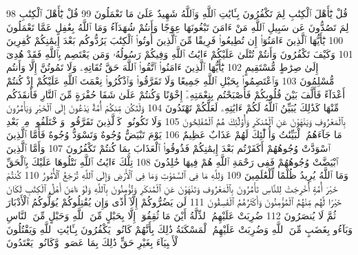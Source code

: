 {\tiny\colorbox{cl_aya}{98}} قُلْ يَٰٓأَهْلَ ٱلْكِتَٰبِ لِمَ تَكْفُرُونَ بِـَٔايَٰتِ ٱللَّهِ وَٱللَّهُ شَهِيدٌ عَلَىٰ مَا تَعْمَلُونَ
{\tiny\colorbox{cl_aya}{99}} قُلْ يَٰٓأَهْلَ ٱلْكِتَٰبِ لِمَ تَصُدُّونَ عَن سَبِيلِ ٱللَّهِ مَنْ ءَامَنَ تَبْغُونَهَا عِوَجًا وَأَنتُمْ شُهَدَآءُ وَمَا ٱللَّهُ بِغَٰفِلٍ عَمَّا تَعْمَلُونَ
{\tiny\colorbox{cl_aya}{100}} يَٰٓأَيُّهَا ٱلَّذِينَ ءَامَنُوٓا۟ إِن تُطِيعُوا۟ فَرِيقًا مِّنَ ٱلَّذِينَ أُوتُوا۟ ٱلْكِتَٰبَ يَرُدُّوكُم بَعْدَ إِيمَٰنِكُمْ كَٰفِرِينَ
{\tiny\colorbox{cl_aya}{101}} وَكَيْفَ تَكْفُرُونَ وَأَنتُمْ تُتْلَىٰ عَلَيْكُمْ ءَايَٰتُ ٱللَّهِ وَفِيكُمْ رَسُولُهُۥ وَمَن يَعْتَصِم بِٱللَّهِ فَقَدْ هُدِىَ إِلَىٰ صِرَٰطٍ مُّسْتَقِيمٍ
{\tiny\colorbox{cl_aya}{102}} يَٰٓأَيُّهَا ٱلَّذِينَ ءَامَنُوا۟ ٱتَّقُوا۟ ٱللَّهَ حَقَّ تُقَاتِهِۦ وَلَا تَمُوتُنَّ إِلَّا وَأَنتُم مُّسْلِمُونَ
{\tiny\colorbox{cl_aya}{103}} وَٱعْتَصِمُوا۟ بِحَبْلِ ٱللَّهِ جَمِيعًا وَلَا تَفَرَّقُوا۟ وَٱذْكُرُوا۟ نِعْمَتَ ٱللَّهِ عَلَيْكُمْ إِذْ كُنتُمْ أَعْدَآءً فَأَلَّفَ بَيْنَ قُلُوبِكُمْ فَأَصْبَحْتُم بِنِعْمَتِهِۦٓ إِخْوَٰنًا وَكُنتُمْ عَلَىٰ شَفَا حُفْرَةٍ مِّنَ ٱلنَّارِ فَأَنقَذَكُم مِّنْهَا كَذَٰلِكَ يُبَيِّنُ ٱللَّهُ لَكُمْ ءَايَٰتِهِۦ لَعَلَّكُمْ تَهْتَدُونَ
{\tiny\colorbox{cl_aya}{104}} وَلْتَكُن مِّنكُمْ أُمَّةٌ يَدْعُونَ إِلَى ٱلْخَيْرِ وَيَأْمُرُونَ بِٱلْمَعْرُوفِ وَيَنْهَوْنَ عَنِ ٱلْمُنكَرِ وَأُو۟لَٰٓئِكَ هُمُ ٱلْمُفْلِحُونَ
{\tiny\colorbox{cl_aya}{105}} وَلَا تَكُونُوا۟ كَٱلَّذِينَ تَفَرَّقُوا۟ وَٱخْتَلَفُوا۟ مِنۢ بَعْدِ مَا جَآءَهُمُ ٱلْبَيِّنَٰتُ وَأُو۟لَٰٓئِكَ لَهُمْ عَذَابٌ عَظِيمٌ
{\tiny\colorbox{cl_aya}{106}} يَوْمَ تَبْيَضُّ وُجُوهٌ وَتَسْوَدُّ وُجُوهٌ فَأَمَّا ٱلَّذِينَ ٱسْوَدَّتْ وُجُوهُهُمْ أَكَفَرْتُم بَعْدَ إِيمَٰنِكُمْ فَذُوقُوا۟ ٱلْعَذَابَ بِمَا كُنتُمْ تَكْفُرُونَ
{\tiny\colorbox{cl_aya}{107}} وَأَمَّا ٱلَّذِينَ ٱبْيَضَّتْ وُجُوهُهُمْ فَفِى رَحْمَةِ ٱللَّهِ هُمْ فِيهَا خَٰلِدُونَ
{\tiny\colorbox{cl_aya}{108}} تِلْكَ ءَايَٰتُ ٱللَّهِ نَتْلُوهَا عَلَيْكَ بِٱلْحَقِّ وَمَا ٱللَّهُ يُرِيدُ ظُلْمًا لِّلْعَٰلَمِينَ
{\tiny\colorbox{cl_aya}{109}} وَلِلَّهِ مَا فِى ٱلسَّمَٰوَٰتِ وَمَا فِى ٱلْأَرْضِ وَإِلَى ٱللَّهِ تُرْجَعُ ٱلْأُمُورُ
{\tiny\colorbox{cl_aya}{110}} كُنتُمْ خَيْرَ أُمَّةٍ أُخْرِجَتْ لِلنَّاسِ تَأْمُرُونَ بِٱلْمَعْرُوفِ وَتَنْهَوْنَ عَنِ ٱلْمُنكَرِ وَتُؤْمِنُونَ بِٱللَّهِ وَلَوْ ءَامَنَ أَهْلُ ٱلْكِتَٰبِ لَكَانَ خَيْرًا لَّهُم مِّنْهُمُ ٱلْمُؤْمِنُونَ وَأَكْثَرُهُمُ ٱلْفَٰسِقُونَ
{\tiny\colorbox{cl_aya}{111}} لَن يَضُرُّوكُمْ إِلَّآ أَذًى وَإِن يُقَٰتِلُوكُمْ يُوَلُّوكُمُ ٱلْأَدْبَارَ ثُمَّ لَا يُنصَرُونَ
{\tiny\colorbox{cl_aya}{112}} ضُرِبَتْ عَلَيْهِمُ ٱلذِّلَّةُ أَيْنَ مَا ثُقِفُوٓا۟ إِلَّا بِحَبْلٍ مِّنَ ٱللَّهِ وَحَبْلٍ مِّنَ ٱلنَّاسِ وَبَآءُو بِغَضَبٍ مِّنَ ٱللَّهِ وَضُرِبَتْ عَلَيْهِمُ ٱلْمَسْكَنَةُ ذَٰلِكَ بِأَنَّهُمْ كَانُوا۟ يَكْفُرُونَ بِـَٔايَٰتِ ٱللَّهِ وَيَقْتُلُونَ ٱلْأَنۢبِيَآءَ بِغَيْرِ حَقٍّ ذَٰلِكَ بِمَا عَصَوا۟ وَّكَانُوا۟ يَعْتَدُونَ

